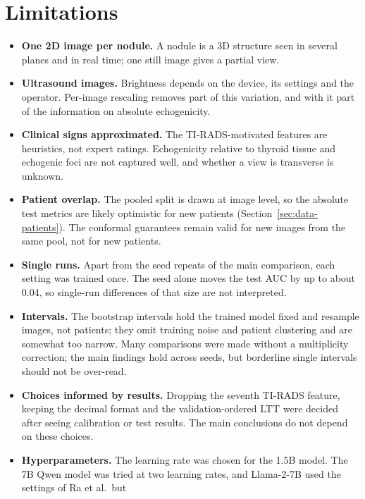 \section{Limitations}
\label{sec:disc-limitations}

\begin{itemize}
  \item \textbf{One 2D image per nodule.} A nodule is a 3D structure seen in several planes and in
        real time; one still image gives a partial view.
  \item \textbf{Ultrasound images.} Brightness depends on the device, its settings and the
        operator. Per-image rescaling removes part of this variation, and with it part of the
        information on absolute echogenicity.
  \item \textbf{Clinical signs approximated.} The TI-RADS-motivated features are heuristics, not
        expert ratings. Echogenicity relative to thyroid tissue and echogenic foci are not
        captured well, and whether a view is transverse is unknown.
  \item \textbf{Patient overlap.} The pooled split is drawn at image level, so the absolute test
        metrics are likely optimistic for new patients (Section~\ref{sec:data-patients}). The
        conformal guarantees remain valid for new images from the same pool, not for new
        patients.
  \item \textbf{Single runs.} Apart from the seed repeats of the main comparison, each setting was
        trained once. The seed alone moves the test AUC by up to about 0.04, so single-run
        differences of that size are not interpreted.
  \item \textbf{Intervals.} The bootstrap intervals hold the trained model fixed and resample
        images, not patients; they omit training noise and patient clustering and are somewhat
        too narrow. Many comparisons were made without a multiplicity correction; the main
        findings hold across seeds, but borderline single intervals should not be over-read.
  \item \textbf{Choices informed by results.} Dropping the seventh TI-RADS feature, keeping the
        decimal format and the validation-ordered LTT were decided after seeing calibration or
        test results. The main conclusions do not depend on these choices.
  \item \textbf{Hyperparameters.} The learning rate was chosen for the 1.5B model. The 7B Qwen
        model was tried at two learning rates, and Llama-2-7B used the settings of Ra et al.\ but

\end{itemize}
